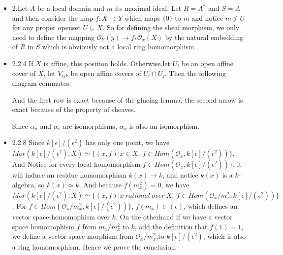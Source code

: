 \documentclass[11pt]{article}
\begin{document}
\begin{itemize}
\item 2.Let $A$ be a local domain and $m$ its maximal ideal. Let $R=A^*$ and $S=A$ and then consider the map $f: X\to Y$ which maps $\{0\}$ to $m$ and notice $m \notin U$ for any proper openset $U\subseteq X$. So for defining the sheaf morphism, we only need to define the mapping $\mathcal{O}_Y(y)\rightarrow f_* \mathcal{O}_x(X)$ by the natural embedding of $R$ in $S$ which is obviously not a local ring homomorphism.
\item 2.2.4 If $X$ is affine, this position holds. Otherwise,let $U_i$ be an open affine cover of $X$, let $V_{ijk}$ be open affine covers of $U_i\cap U_j$. Then the following diagram commutes:
    


And the first row is exact because of the glueing lemma, the second arrow is exact because of the property of sheaves.

Since $\alpha_u$ and $\alpha_v$ are isomorphisms, $\alpha_x$ is also an isomorphism.
\item 2.2.8 Since $k[\epsilon]/(\epsilon^2)$ has only one point, we have $Mor(k[\epsilon]/(\epsilon^2),X) \simeq \{(x,f)| x\in X,\ f\in Hom(\mathcal{O}_x, k[\epsilon]/(\epsilon^2))\}$. And Notice for every local homomorphism   $f\in Hom(\mathcal{O}_x, k[\epsilon]/(\epsilon^2))\}$, it will induce an residue homomorphism $k(x)\to k$, and notice $k(x)$ is a $k$-algebra, so $k(x)\simeq k$. And because $f(m_x^2)=0$, we have $Mor(k[\epsilon]/(\epsilon^2),X) \simeq \{(x,f)| x \ rational \ over \  X,\ f\in Hom(\mathcal{O}_x/m_x^2, k[\epsilon]/(\epsilon^2))\}$. For $f\in Hom(\mathcal{O}_x/m_x^2, k[\epsilon]/(\epsilon^2))\}$, $f(m_x)\in (\epsilon)$, which defines an vector space homomophism over $k$. On the otherhand if we have a vector space homomophism $f$ from $m_x/m_x^2$ to $k$, add the definition that $f(1)=1$, we define a vector space morphism from  $\mathcal{O}_x/m_x^2$,to $k[\epsilon]/(\epsilon^2)$, which is also a ring homomorphism. 
Hence we prove the conclusion.


\end{itemize}
\end{document}
